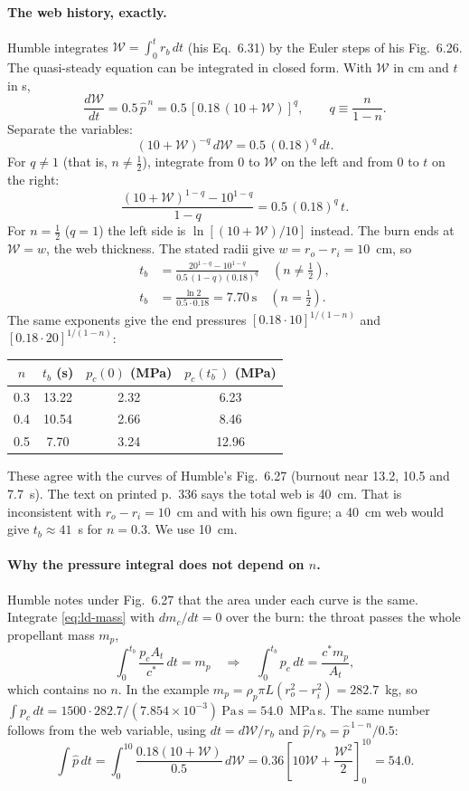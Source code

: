 \paragraph{The web history, exactly.} Humble integrates
$\mathcal W=\int_0^{t}r_b\,dt$ (his Eq.~6.31) by the Euler steps of
his Fig.~6.26. The quasi-steady equation can be integrated in closed
form. With $\mathcal W$ in cm and $t$ in s,
\[
 \frac{d\mathcal W}{dt}=0.5\,\hat p^{\,n}
 =0.5\,[0.18\,(10+\mathcal W)]^{q},
 \qquad q\equiv\frac{n}{1-n}.
\]
Separate the variables:
\[
 (10+\mathcal W)^{-q}\,d\mathcal W=0.5\,(0.18)^q\,dt .
\]
For $q\neq1$ (that is, $n\neq\tfrac12$), integrate from $0$ to
$\mathcal W$ on the left and from $0$ to $t$ on the right:
\[
 \frac{(10+\mathcal W)^{1-q}-10^{1-q}}{1-q}=0.5\,(0.18)^q\,t .
\]
For $n=\tfrac12$ ($q=1$) the left side is
$\ln[(10+\mathcal W)/10]$ instead. The burn ends at $\mathcal W=w$,
the web thickness. The stated radii give $w=r_o-r_i=10$~cm, so
\begin{align*}
 t_b&=\frac{20^{1-q}-10^{1-q}}{0.5\,(1-q)(0.18)^q}
 \quad(n\neq\tfrac12),\\
 t_b&=\frac{\ln2}{0.5\cdot0.18}=7.70\ \mathrm s
 \quad(n=\tfrac12).
\end{align*}
The same exponents give the end pressures
$[0.18\cdot10]^{1/(1-n)}$ and $[0.18\cdot20]^{1/(1-n)}$:
\begin{center}
\begin{tabular}{cccc}
$n$ & $t_b$ (s) & $p_c(0)$ (MPa) & $p_c(t_b^-)$ (MPa)\\ \hline
0.3 & 13.22 & 2.32 & 6.23\\
0.4 & 10.54 & 2.66 & 8.46\\
0.5 & 7.70 & 3.24 & 12.96
\end{tabular}
\end{center}
These agree with the curves of Humble's Fig.~6.27 (burnout near
13.2, 10.5 and 7.7~s). The text on printed p.~336 says the total web is
40~cm. That is inconsistent with $r_o-r_i=10$~cm and with his own
figure; a 40~cm web would give $t_b\approx41$~s for $n=0.3$. We use
10~cm.

\paragraph{Why the pressure integral does not depend on $n$.}
Humble notes under Fig.~6.27 that the area under each curve is the
same. Integrate \eqref{eq:ld-mass} with $dm_c/dt=0$ over the burn:
the throat passes the whole propellant mass $m_p$,
\[
 \int_0^{t_b}\frac{p_cA_t}{c^*}\,dt=m_p
 \quad\Longrightarrow\quad
 \int_0^{t_b}p_c\,dt=\frac{c^*m_p}{A_t},
\]
which contains no $n$. In the example
$m_p=\rho_p\pi L(r_o^2-r_i^2)=282.7$~kg, so
$\int p_c\,dt=1500\cdot282.7/(7.854\times10^{-3})\ \mathrm{Pa\,s}
=54.0$~MPa\,s. The same number follows from the web variable,
using $dt=d\mathcal W/r_b$ and $\hat p/r_b=\hat p^{\,1-n}/0.5$:
\[
 \int\hat p\,dt=\int_0^{10}\frac{0.18(10+\mathcal W)}{0.5}\,d\mathcal W
 =0.36\left[10\mathcal W+\frac{\mathcal W^2}{2}\right]_0^{10}=54.0 .
\]

